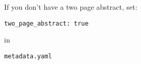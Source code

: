 If you don't have a two page abstract, set:

{\tt two\_page\_abstract: true}  

in

{\tt metadata.yaml}

